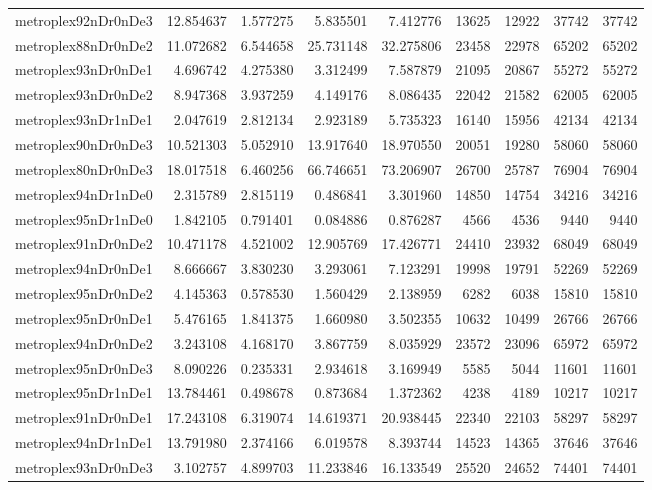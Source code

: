 \begin{longtable}{|l|r|r|r|r|r|r|r|r|}
metroplex92nDr0nDe3 & 12.854637 & 1.577275 & 5.835501 & 7.412776 & 13625 & 12922 & 37742 & 37742 \\
metroplex88nDr0nDe2 & 11.072682 & 6.544658 & 25.731148 & 32.275806 & 23458 & 22978 & 65202 & 65202 \\
metroplex93nDr0nDe1 & 4.696742 & 4.275380 & 3.312499 & 7.587879 & 21095 & 20867 & 55272 & 55272 \\
metroplex93nDr0nDe2 & 8.947368 & 3.937259 & 4.149176 & 8.086435 & 22042 & 21582 & 62005 & 62005 \\
metroplex93nDr1nDe1 & 2.047619 & 2.812134 & 2.923189 & 5.735323 & 16140 & 15956 & 42134 & 42134 \\
metroplex90nDr0nDe3 & 10.521303 & 5.052910 & 13.917640 & 18.970550 & 20051 & 19280 & 58060 & 58060 \\
metroplex80nDr0nDe3 & 18.017518 & 6.460256 & 66.746651 & 73.206907 & 26700 & 25787 & 76904 & 76904 \\
metroplex94nDr1nDe0 & 2.315789 & 2.815119 & 0.486841 & 3.301960 & 14850 & 14754 & 34216 & 34216 \\
metroplex95nDr1nDe0 & 1.842105 & 0.791401 & 0.084886 & 0.876287 & 4566 & 4536 & 9440 & 9440 \\
metroplex91nDr0nDe2 & 10.471178 & 4.521002 & 12.905769 & 17.426771 & 24410 & 23932 & 68049 & 68049 \\
metroplex94nDr0nDe1 & 8.666667 & 3.830230 & 3.293061 & 7.123291 & 19998 & 19791 & 52269 & 52269 \\
metroplex95nDr0nDe2 & 4.145363 & 0.578530 & 1.560429 & 2.138959 & 6282 & 6038 & 15810 & 15810 \\
metroplex95nDr0nDe1 & 5.476165 & 1.841375 & 1.660980 & 3.502355 & 10632 & 10499 & 26766 & 26766 \\
metroplex94nDr0nDe2 & 3.243108 & 4.168170 & 3.867759 & 8.035929 & 23572 & 23096 & 65972 & 65972 \\
metroplex95nDr0nDe3 & 8.090226 & 0.235331 & 2.934618 & 3.169949 & 5585 & 5044 & 11601 & 11601 \\
metroplex95nDr1nDe1 & 13.784461 & 0.498678 & 0.873684 & 1.372362 & 4238 & 4189 & 10217 & 10217 \\
metroplex91nDr0nDe1 & 17.243108 & 6.319074 & 14.619371 & 20.938445 & 22340 & 22103 & 58297 & 58297 \\
metroplex94nDr1nDe1 & 13.791980 & 2.374166 & 6.019578 & 8.393744 & 14523 & 14365 & 37646 & 37646 \\
metroplex93nDr0nDe3 & 3.102757 & 4.899703 & 11.233846 & 16.133549 & 25520 & 24652 & 74401 & 74401 \\

\end{longtable}
